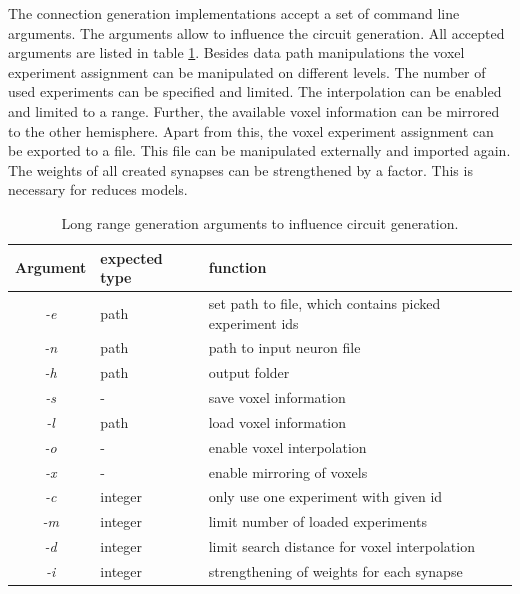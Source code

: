 The connection generation implementations accept a set of command line arguments.
The arguments allow to influence the circuit generation.
All accepted arguments are listed in table \ref{tab:longrangeargs}.
Besides data path manipulations the voxel experiment assignment can be 
manipulated on different levels. The number of used experiments can be specified
and limited. The interpolation can be enabled and limited to a range.
Further, the available voxel information can be mirrored to the other hemisphere.
Apart from this, the voxel experiment assignment can be exported to a file.
This file can be manipulated externally and imported again.
The weights of all created synapses can be strengthened by a factor.
This is necessary for reduces models.
\begin{table}[ht!]
\begin{centering}
    \begin{tabular}{ | c | l | p{7cm} |}
    \hline
    Argument & expected type & function \\ \hline \hline
    \emph{-e} & path & set path to file, which contains picked experiment ids \\ \hline
    \emph{-n} & path & path to input neuron file \\ \hline
    \emph{-h} & path & output folder\\ \hline
    \emph{-s} & - & save voxel information\\ \hline
    \emph{-l} & path & load voxel information\\ \hline
    \emph{-o} & - &  enable voxel interpolation\\ \hline
    \emph{-x} & - &  enable mirroring of voxels\\ \hline
    \emph{-c} & integer & only use one experiment with given id \\ \hline
    \emph{-m} & integer & limit number of loaded experiments \\ \hline
    \emph{-d} & integer & limit search distance for voxel interpolation \\ \hline
    \emph{-i} & integer & strengthening of weights for each synapse \\ \hline
    \end{tabular}
    \caption{Long range generation arguments to influence circuit generation.}
    \label{tab:longrangeargs}
\end{centering}
\end{table}


